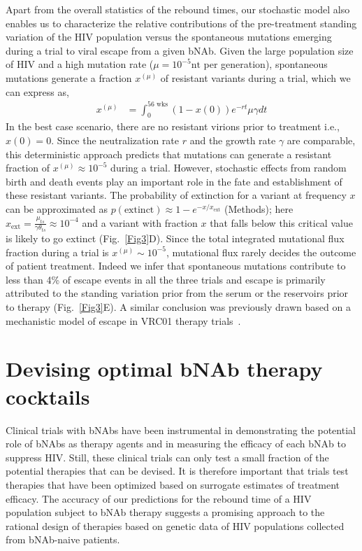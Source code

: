 \documentclass[aps,prx,noshowpacs,twocolumn,nofootinbib]{revtex4-2}
\begin{document}
Apart from the overall statistics of the rebound times, our stochastic model also enables us to characterize the relative contributions of the pre-treatment standing variation of the HIV population versus the spontaneous  mutations emerging during a trial to viral escape from a given bNAb. Given the large population size of HIV  and a high mutation rate ($\mu =10^{-5} \text{nt}$ per generation), spontaneous mutations generate a fraction $x^{(\mu)}$  of resistant variants during a trial, which we can express as, 
\begin{align}
x^{(\mu)}&=  \int_0^{56 \text{ wks}} (1-x(0))  e^{-r t } \mu \gamma dt \end{align}
In the best case scenario, there are no resistant virions prior to treatment i.e., $x(0)=0$. Since the neutralization rate $r$ and the growth rate $\gamma$ are comparable, this deterministic approach predicts that mutations can generate a resistant fraction of $x^{(\mu)} \approx 10^{-5}$ during a trial. 
However, stochastic effects from random birth and death events play an important role in the fate  and establishment of these resistant variants. The probability of extinction for a variant at frequency $x$ can be approximated as  $p(\text{extinct}) \approx 1- e^{- x/ x_\text{ext}}$ (Methods); here $x_\text{ext}= \frac{\mu_{ts}}{\gamma \theta_{ts}}\approx 10^{-4}$ and a variant with fraction $x$ that falls below this critical value is likely to go extinct (Fig.~\ref{Fig3}D). Since the total integrated mutational flux fraction during a trial is $x^{(\mu)} \sim 10^{-5}$, mutational flux rarely decides the outcome of patient treatment. Indeed we infer that spontaneous mutations contribute to less than 4\% of escape events in all the three trials and  escape is primarily attributed to the standing variation prior from the serum or the reservoirs prior to therapy (Fig.~\ref{Fig3}E). A similar conclusion was previously drawn based on a mechanistic model of escape in VRC01 therapy trials~\cite{Saha:2020fd}.  


\section{Devising optimal bNAb therapy cocktails}
Clinical trials with bNAbs have been instrumental in demonstrating the potential role of bNAbs  as therapy agents and in measuring the efficacy of each bNAb to suppress HIV. Still, these clinical trials {can only test a small fraction of the potential therapies that can be devised. It is therefore important that trials test therapies that have been optimized based on surrogate estimates of treatment efficacy.}  The accuracy of our predictions  for the rebound time of a HIV population subject to  bNAb therapy suggests a promising approach to the rational design of therapies based on genetic data of HIV populations collected from bNAb-naive patients. 
	
\end{document}
